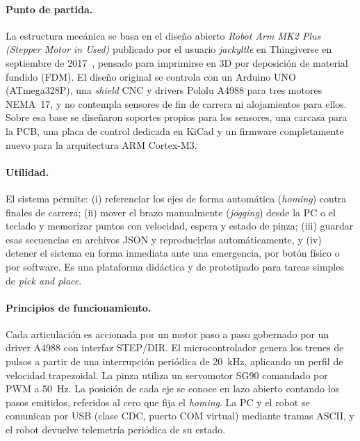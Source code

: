 \paragraph{Punto de partida.}
La estructura mecánica se basa en el diseño abierto \emph{Robot Arm MK2 Plus (Stepper Motor
in Used)} publicado por el usuario \emph{jackyltle} en Thingiverse en septiembre de
2017~\cite{thingiverse}, pensado para imprimirse en 3D por deposición de material fundido
(FDM). El diseño original se controla con un Arduino UNO (ATmega328P), una \emph{shield} CNC
y drivers Pololu A4988 para tres motores NEMA~17, y no contempla sensores de fin de carrera ni
alojamientos para ellos. Sobre esa base se diseñaron soportes propios para los sensores, una
carcasa para la PCB, una placa de control dedicada en KiCad y un firmware completamente nuevo
para la arquitectura ARM Cortex-M3.


\paragraph{Utilidad.}
El sistema permite: (i) referenciar los ejes de forma automática (\emph{homing}) contra
finales de carrera; (ii) mover el brazo manualmente (\emph{jogging}) desde la PC o el teclado
y memorizar puntos con velocidad, espera y estado de pinza; (iii) guardar esas secuencias en
archivos JSON y reproducirlas automáticamente, y (iv) detener el sistema en forma inmediata
ante una emergencia, por botón físico o por software. Es una plataforma didáctica y de
prototipado para tareas simples de \emph{pick and place}.

\paragraph{Principios de funcionamiento.}
Cada articulación es accionada por un motor paso a paso gobernado por un driver A4988 con
interfaz STEP/DIR. El microcontrolador genera los trenes de pulsos a partir de una
interrupción periódica de \SI{20}{\kilo\hertz}, aplicando un perfil de velocidad
trapezoidal. La pinza utiliza un servomotor SG90 comandado por PWM a \SI{50}{\hertz}. La
posición de cada eje se conoce en lazo abierto contando los pasos emitidos, referidos al cero
que fija el \emph{homing}. La PC y el robot se comunican por USB (clase CDC, puerto COM
virtual) mediante tramas ASCII, y el robot devuelve telemetría periódica de su estado.

